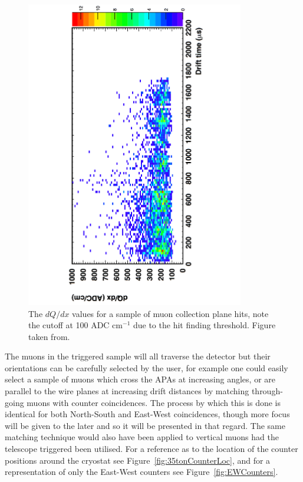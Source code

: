 \begin{figure}[h!]
  \centering
  \includegraphics[width=0.85\textwidth]{TingjunLifetime}
  \caption[$dQ/dx$ in the 35 ton as a function of drift time]
          {The $dQ/dx$ values for a sample of muon collection plane hits, note the cutoff at 100 ADC cm$^{-1}$ due to the hit finding threshold. Figure taken from\citep{TingjunLifetime}.}
  \label{fig:TingjunLifetime}
\end{figure}  

The muons in the triggered sample will all traverse the detector but their orientations can be carefully selected by the user, for example one could easily select a sample of muons which cross the APAs at increasing angles, or are parallel to the wire planes at increasing drift distances by matching through-going muons with counter coincidences. The process by which this is done is identical for both North-South and East-West coincidences, though more focus will be given to the later and so it will be presented in that regard. The same matching technique would also have been applied to vertical muons had the telescope triggered been utilised. For a reference as to the location of the counter positions around the cryostat see Figure~\ref{fig:35tonCounterLoc}, and for a representation of only the East-West counters see Figure~\ref{fig:EWCounters}. \\

